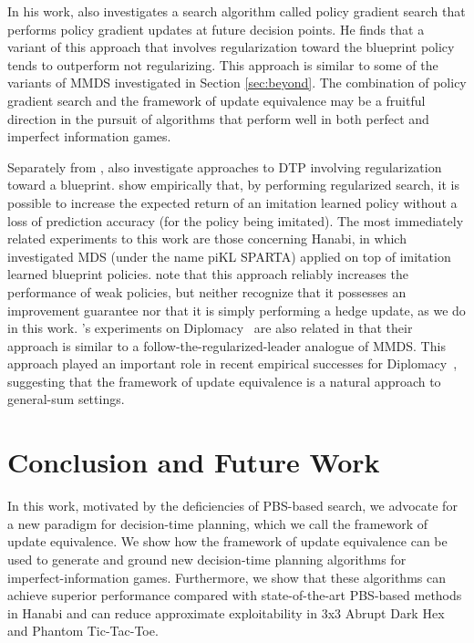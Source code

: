 \documentclass{article} %
\theoremstyle{plain}
\theoremstyle{definition}
\theoremstyle{remark}
\begin{document}
In his work, \citet{exit-thesis} also investigates a search algorithm called policy gradient search that performs policy gradient updates at future decision points.
He finds that a variant of this approach that involves regularization toward the blueprint policy tends to outperform not regularizing.
This approach is similar to some of the variants of MMDS investigated in Section \ref{sec:beyond}.
The combination of policy gradient search and the framework of update equivalence may be a fruitful direction in the pursuit of algorithms that perform well in both perfect and imperfect information games.

Separately from \citet{exit-thesis}, \citet{pikl} also investigate approaches to DTP involving regularization toward a blueprint.
\citet{pikl} show empirically that, by performing regularized search, it is possible to increase the expected return of an imitation learned policy without a loss of prediction accuracy (for the policy being imitated).
The most immediately related experiments to this work are those concerning Hanabi, in which \citet{pikl} investigated MDS (under the name piKL SPARTA) applied on top of imitation learned blueprint policies.
\citet{pikl} note that this approach reliably increases the performance of weak policies, but neither recognize that it possesses an improvement guarantee nor that it is simply performing a hedge update, as we do in this work.
\citet{pikl}'s experiments on Diplomacy~\citep{paquette2019no} are also related in that their approach is similar to a follow-the-regularized-leader analogue of MMDS.
This approach played an important role in recent empirical successes for
Diplomacy~\citep{diplodocus,cicero}, suggesting that the framework of update equivalence is a natural approach to general-sum settings.

\section{Conclusion and Future Work}

In this work, motivated by the deficiencies of PBS-based search, we advocate for a new paradigm for decision-time planning, which we call the framework of update equivalence.
We show how the framework of update equivalence can be used to generate and ground new decision-time planning algorithms for imperfect-information games.
Furthermore, we show that these algorithms can achieve superior performance compared with state-of-the-art PBS-based methods in Hanabi and can reduce approximate exploitability in 3x3 Abrupt Dark Hex and Phantom Tic-Tac-Toe.
\end{document}

